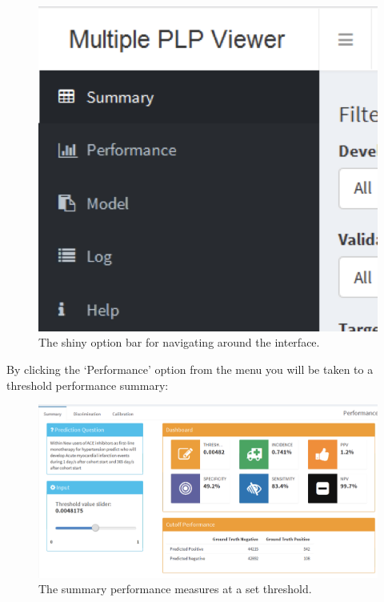 \documentclass[11pt]{book}
\theoremstyle{definition}
\theoremstyle{definition}
\theoremstyle{definition}
\theoremstyle{remark}
\begin{document}
\begin{figure}

{\centering \includegraphics[width=0.8\linewidth]{images/PatientLevelPrediction/shiny/shinyBar} 

}

\caption{The shiny option bar for navigating around the interface.}\label{fig:shinyBar}
\end{figure}

By clicking the `Performance' option from the menu you will be taken to a threshold performance summary:

\begin{figure}

{\centering \includegraphics[width=0.8\linewidth]{images/PatientLevelPrediction/shiny/shinyPerformanceSum} 

}

\caption{The summary performance measures at a set threshold.}\label{fig:shinyPerformanceSum}
\end{figure}
\end{document}
